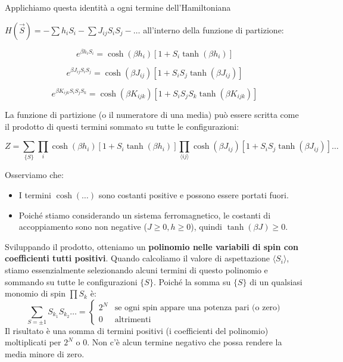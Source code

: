 \noindent Applichiamo questa identità a ogni termine dell'Hamiltoniana 

$H(\vec{S}) = - \sum h_i S_i - \sum J_{ij} S_i S_j - \dots$ all'interno della funzione di partizione:

\begin{equation}
e^{\beta h_i S_i} = \cosh(\beta h_i) [1 + S_i \tanh(\beta h_i)]
\end{equation}

\begin{equation}
e^{\beta J_{ij} S_i S_j} = \cosh(\beta J_{ij}) [1 + S_i S_j \tanh(\beta J_{ij})]
\end{equation}

\begin{equation}
e^{\beta K_{ijk} S_i S_j S_k} = \cosh(\beta K_{ijk}) [1 + S_i S_j S_k \tanh(\beta K_{ijk})]
\end{equation}

La funzione di partizione (o il numeratore di una media) può essere scritta come il prodotto di questi termini sommato su tutte le configurazioni:

\begin{equation}
Z = \sum_{\{S\}} \prod_i \cosh(\beta h_i) [1 + S_i \tanh(\beta h_i)] \prod_{\langle ij \rangle} \cosh(\beta J_{ij}) [1 + S_i S_j\tanh(\beta J_{ij})] \dots
\end{equation}


Osserviamo che:
\begin{itemize}
    \item I termini $\cosh(\dots)$ sono costanti positive e possono essere portati fuori.
    \item Poiché stiamo considerando un sistema ferromagnetico, le costanti di accoppiamento sono non negative ($J \ge 0, h \ge 0$), quindi $\tanh(\beta J) \ge 0$.
\end{itemize}

Sviluppando il prodotto, otteniamo un \textbf{polinomio nelle variabili di spin con coefficienti tutti positivi}.
Quando calcoliamo il valore di aspettazione $\langle S_i \rangle$, stiamo essenzialmente selezionando alcuni termini di questo polinomio e sommando su tutte le configurazioni $\{S\}$.
Poiché la somma su $\{S\}$ di un qualsiasi monomio di spin $\prod S_k$ è:
\begin{equation}
\sum_{S=\pm 1} S_{k_1} S_{k_2} \dots = 
\begin{cases} 
2^N & \text{se ogni spin appare una potenza pari (o zero)} \\
0 & \text{altrimenti}
\end{cases}
\end{equation}
Il risultato è una somma di termini positivi (i coefficienti del polinomio) moltiplicati per $2^N$ o $0$. Non c'è alcun termine negativo che possa rendere la media minore di zero.

